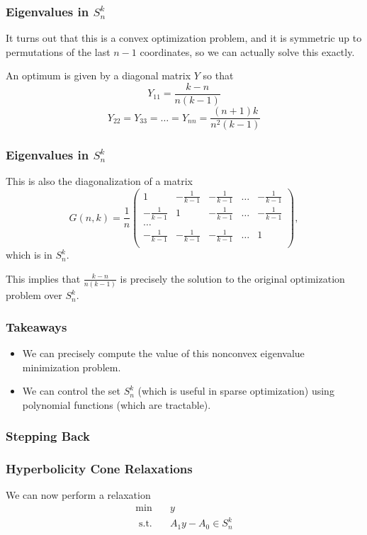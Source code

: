 \documentclass{beamer}
\newcommand{\st}{{\text{ s.t. }}}
\begin{document}
\begin{frame}
    \frametitle{Eigenvalues in $S^k_n$}
    It turns out that this is a convex optimization problem, and it is symmetric up to permutations of the last $n-1$ coordinates, so we can actually solve this exactly.
    
    An optimum is given by a diagonal matrix $Y$ so that 
    \[
        Y_{11} = \frac{k-n}{n(k-1)}
    \]
    \[
        Y_{22} = Y_{33}  =\dots= Y_{nn} = \frac{(n+1)k}{n^2(k-1)}
    \]
\end{frame}
\begin{frame}
    \frametitle{Eigenvalues in $S^k_n$}
    This is also the diagonalization of a matrix
    \[
        G(n,k) = 
        \frac{1}{n}
        \begin{pmatrix}
            1 & -\frac{1}{k-1} & -\frac{1}{k-1}  &\dots& -\frac{1}{k-1}\\
            -\frac{1}{k-1} & 1 & -\frac{1}{k-1}  &\dots& -\frac{1}{k-1}\\
            \dots\\
            -\frac{1}{k-1} & -\frac{1}{k-1}& -\frac{1}{k-1}  &\dots & 1\\
        \end{pmatrix},
    \]
    which is in $S^k_n$.

    This implies that $\frac{k-n}{n(k-1)}$ is precisely the solution to the original optimization problem over $S^k_n$.
\end{frame}
\begin{frame}
    \frametitle{Takeaways}
    \begin{itemize}
        \item We can precisely compute the value of this nonconvex eigenvalue minimization problem.
        \item We can control the set $S^k_n$ (which is useful in sparse optimization) using polynomial functions (which are tractable).
    \end{itemize}
\end{frame}
\begin{frame}
    \frametitle{Stepping Back}
\end{frame}
\begin{frame}
    \frametitle{Hyperbolicity Cone Relaxations}
    We can now perform a relaxation
    \begin{equation}
        \begin{aligned}
            \min\quad & y\\
            \st & A_1y - A_0 \in S^k_n\\
        \end{aligned}
    \end{equation}
\end{frame}
\end{document}
